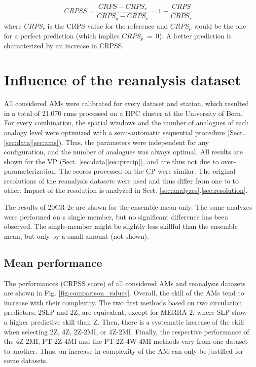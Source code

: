 \documentclass{ametsoc}
\begin{document}
\begin{equation}
\label{eq:CRPSS}
CRPSS = \frac{CRPS-CRPS_{r}}{CRPS_{p}-CRPS_{r}} = 1-\frac{CRPS}{CRPS_{r}}
\end{equation}
where $CRPS_{r}$ is the CRPS value for the reference and $CRPS_{p}$ would be the one for a perfect prediction (which implies $CRPS_{p}~=~0$). A better prediction is characterized by an increase in CRPSS.



\section{Influence of the reanalysis dataset}

All considered AMs were calibrated for every dataset and station, which resulted in a total of 21,070 runs processed on a HPC cluster at the University of Bern. For every combination, the spatial windows and the number of analogues of each analogy level were optimized with a semi-automatic sequential procedure (Sect. \ref{sec:data}\ref{sec:ams}). Thus, the parameters were independent for any configuration, and the number of analogues was always optimal. All results are shown for the VP (Sect. \ref{sec:data}\ref{sec:precip}), and are thus not due to over-parameterization. The scores processed on the CP were similar. The original resolutions of the reanalysis datasets were used and thus differ from one to to other. Impact of the resolution is analyzed in Sect. \ref{sec:analyzes}.\ref{sec:resolution}.

The results of 20CR-2c are shown for the ensemble mean only. The same analyzes were performed on a single member, but no significant difference has been observed. The single-member might be slightly less skillful than the ensemble mean, but only by a small amount (not shown).


\subsection{Mean performance}

The performances (CRPSS score) of all considered AMs and reanalysis datasets are shown in Fig. \ref{fig:comparison_values}. Overall, the skill of the AMs tend to increase with their complexity. The two first methods based on two circulation predictors, 2SLP and 2Z, are equivalent, except for MERRA-2, where SLP show a higher predictive skill than Z. Then, there is a systematic increase of the skill when selecting 2Z, 4Z, 2Z-2MI, or 4Z-2MI. Finally, the respective performance of the 4Z-2MI, PT-2Z-4MI and the PT-2Z-4W-4MI methods vary from one dataset to another. Thus, an increase in complexity of the AM can only be justified for some datasets.
\end{document}
